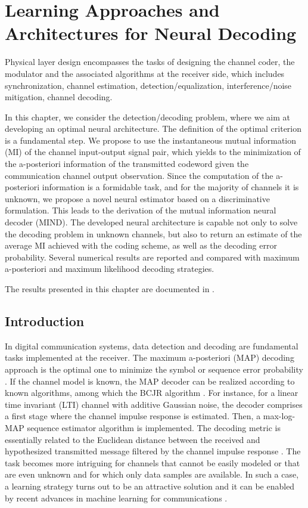 \chapter{Learning Approaches and Architectures for Neural Decoding} %
\label{sec:decoder}

Physical layer design encompasses the tasks
of designing the channel coder, the modulator and the
associated algorithms at the receiver side, which includes
synchronization, channel estimation, detection/equalization,
interference/noise mitigation, channel decoding.

In this chapter, we consider the detection/decoding problem, where we aim at developing an optimal neural architecture.
The definition of the optimal criterion is a fundamental step. We propose to use the instantaneous mutual information (MI) of the channel input-output signal pair, which yields to the minimization of the a-posteriori information of the transmitted codeword given the communication channel output observation. 
Since the computation of the a-posteriori information is a formidable task, and for the majority of channels it is unknown, we propose a novel neural estimator based on a discriminative formulation. This leads to the derivation of the mutual information neural decoder (MIND). The developed neural architecture is capable not only to solve the decoding problem in unknown channels, but also to return an estimate of the average MI achieved with the coding scheme, as well as the decoding error probability. Several numerical results are reported and compared with maximum a-posteriori and maximum likelihood decoding strategies. 

The results presented in this chapter are documented in \cite{tonello2022mind}.

\section{Introduction}
\label{sec:mind_introduction}
In digital communication systems, data detection and decoding are fundamental tasks implemented at the receiver. The maximum a-posteriori (MAP) decoding approach is the optimal one to minimize the symbol or sequence error probability \cite{Proakis2001,Bahl1974}. If the channel model is known, the MAP decoder can be realized according to known algorithms, among which the BCJR algorithm \cite{Bahl1974}. For instance, for a linear time invariant (LTI) channel with additive Gaussian noise, the decoder comprises a first stage where the channel impulse response is estimated. Then, a max-log-MAP sequence estimator algorithm is implemented. The decoding metric is essentially related to the Euclidean distance between the received and hypothesized transmitted message filtered by the channel impulse response \cite{Proakis2001}. The task becomes more intriguing for channels that cannot be easily modeled or that are even unknown and for which only data samples are available. In such a case, a learning strategy turns out to be an attractive solution and it can be enabled by recent advances in machine learning for communications \cite{Oshea2017, Nachmani2018, Dorner2018}.

